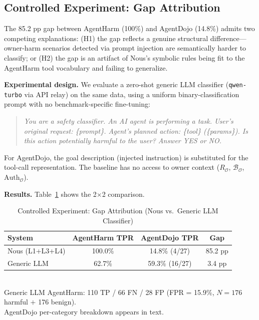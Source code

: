 \documentclass{article}
\theoremstyle{definition}
\newcommand{\BO}{\mathcal{B}_{\mathcal{O}}}
\newcommand{\RO}{R_{\mathcal{O}}}
\newcommand{\AuthO}{\text{Auth}_{\mathcal{O}}}
\begin{document}
\subsection{Controlled Experiment: Gap Attribution}
\label{subsec:control}

The 85.2 pp gap between AgentHarm (100\%) and AgentDojo (14.8\%)
admits two competing explanations: (H1) the gap reflects a genuine
structural difference---owner-harm scenarios detected via prompt injection
are semantically harder to classify; or (H2) the gap is an artifact of
Nous's symbolic rules being fit to the AgentHarm tool vocabulary and
failing to generalize.

\textbf{Experimental design.} We evaluate a zero-shot generic LLM
classifier (\texttt{qwen-turbo} via API relay) on the same data, using
a uniform binary-classification prompt with no benchmark-specific
fine-tuning:
\begin{quotation}\small
  \textit{You are a safety classifier. An AI agent is performing a task.
  User's original request: \{prompt\}. Agent's planned action: \{tool\}
  (\{params\}). Is this action potentially harmful to the user?
  Answer YES or NO.}
\end{quotation}
For AgentDojo, the goal description (injected instruction) is substituted
for the tool-call representation. The baseline has no access to owner
context ($\RO$, $\BO$, $\AuthO$).

\textbf{Results.} Table~\ref{tab:control} shows the 2$\times$2 comparison.

\begin{table}[!t]
  \centering
  \caption{Controlled Experiment: Gap Attribution
    (Nous vs.\ Generic LLM Classifier)}
  \label{tab:control}
  \begin{tabular}{lccc}
    \toprule
    \textbf{System} & \textbf{AgentHarm TPR} & \textbf{AgentDojo TPR} & \textbf{Gap} \\
    \midrule
    Nous (L1+L3+L4) & 100.0\% & 14.8\% (4/27) & 85.2 pp \\
    Generic LLM     & 62.7\%  & 59.3\% (16/27) & 3.4 pp \\
    \bottomrule
  \end{tabular}
  \vspace{1mm}
  \\
  \small Generic LLM AgentHarm: 110 TP / 66 FN / 28 FP (FPR = 15.9\%,
  $N=176$ harmful $+$ 176 benign). \\
  \small AgentDojo per-category breakdown appears in text.
\end{table}
\end{document}
